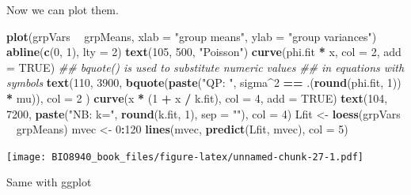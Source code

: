 \documentclass[
  12pt,
]{book}
\newenvironment{Shaded}{\begin{snugshade}}{\end{snugshade}}
\newcommand{\CommentTok}[1]{\textcolor[rgb]{0.56,0.35,0.01}{\textit{#1}}}
\newcommand{\DataTypeTok}[1]{\textcolor[rgb]{0.13,0.29,0.53}{#1}}
\newcommand{\DecValTok}[1]{\textcolor[rgb]{0.00,0.00,0.81}{#1}}
\newcommand{\KeywordTok}[1]{\textcolor[rgb]{0.13,0.29,0.53}{\textbf{#1}}}
\newcommand{\NormalTok}[1]{#1}
\newcommand{\OperatorTok}[1]{\textcolor[rgb]{0.81,0.36,0.00}{\textbf{#1}}}
\newcommand{\OtherTok}[1]{\textcolor[rgb]{0.56,0.35,0.01}{#1}}
\newcommand{\StringTok}[1]{\textcolor[rgb]{0.31,0.60,0.02}{#1}}
\begin{document}
Now we can plot them.

\begin{Shaded}
\begin{Highlighting}[]
\KeywordTok{plot}\NormalTok{(grpVars }\OperatorTok{~}\StringTok{ }\NormalTok{grpMeans, }\DataTypeTok{xlab =} \StringTok{"group means"}\NormalTok{, }\DataTypeTok{ylab =} \StringTok{"group variances"}\NormalTok{)}
\KeywordTok{abline}\NormalTok{(}\KeywordTok{c}\NormalTok{(}\DecValTok{0}\NormalTok{, }\DecValTok{1}\NormalTok{), }\DataTypeTok{lty =} \DecValTok{2}\NormalTok{)}
\KeywordTok{text}\NormalTok{(}\DecValTok{105}\NormalTok{, }\DecValTok{500}\NormalTok{, }\StringTok{"Poisson"}\NormalTok{)}
\KeywordTok{curve}\NormalTok{(phi.fit }\OperatorTok{*}\StringTok{ }\NormalTok{x, }\DataTypeTok{col =} \DecValTok{2}\NormalTok{, }\DataTypeTok{add =} \OtherTok{TRUE}\NormalTok{)}
\CommentTok{## bquote() is used to substitute numeric values}
\CommentTok{## in equations with symbols}
\KeywordTok{text}\NormalTok{(}\DecValTok{110}\NormalTok{, }\DecValTok{3900}\NormalTok{,}
  \KeywordTok{bquote}\NormalTok{(}\KeywordTok{paste}\NormalTok{(}\StringTok{"QP: "}\NormalTok{, sigma}\OperatorTok{^}\DecValTok{2} \OperatorTok{==}\StringTok{ }\NormalTok{.(}\KeywordTok{round}\NormalTok{(phi.fit, }\DecValTok{1}\NormalTok{)) }\OperatorTok{*}\StringTok{ }\NormalTok{mu)),}
  \DataTypeTok{col =} \DecValTok{2}
\NormalTok{)}
\KeywordTok{curve}\NormalTok{(x }\OperatorTok{*}\StringTok{ }\NormalTok{(}\DecValTok{1} \OperatorTok{+}\StringTok{ }\NormalTok{x }\OperatorTok{/}\StringTok{ }\NormalTok{k.fit), }\DataTypeTok{col =} \DecValTok{4}\NormalTok{, }\DataTypeTok{add =} \OtherTok{TRUE}\NormalTok{)}
\KeywordTok{text}\NormalTok{(}\DecValTok{104}\NormalTok{, }\DecValTok{7200}\NormalTok{, }\KeywordTok{paste}\NormalTok{(}\StringTok{"NB: k="}\NormalTok{, }\KeywordTok{round}\NormalTok{(k.fit, }\DecValTok{1}\NormalTok{), }\DataTypeTok{sep =} \StringTok{""}\NormalTok{), }\DataTypeTok{col =} \DecValTok{4}\NormalTok{)}
\NormalTok{Lfit <-}\StringTok{ }\KeywordTok{loess}\NormalTok{(grpVars }\OperatorTok{~}\StringTok{ }\NormalTok{grpMeans)}
\NormalTok{mvec <-}\StringTok{ }\DecValTok{0}\OperatorTok{:}\DecValTok{120}
\KeywordTok{lines}\NormalTok{(mvec, }\KeywordTok{predict}\NormalTok{(Lfit, mvec), }\DataTypeTok{col =} \DecValTok{5}\NormalTok{)}
\end{Highlighting}
\end{Shaded}

\texttt{[image: BIO8940\_book\_files/figure-latex/unnamed-chunk-27-1.pdf]}

Same with ggplot
\end{document}
